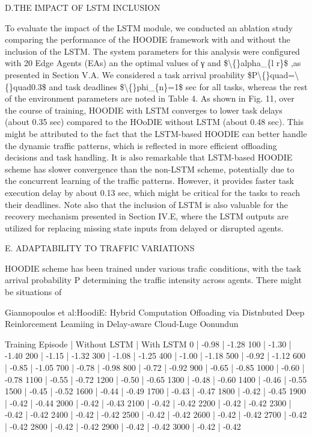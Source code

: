 \documentclass{article}
\begin{document}
D.THE IMPACT OF LSTM INCLUSION

To evaluate the impact of the LSTM module, we conducted an ablation study comparing the performance of the HOODIE framework with and without the inclusion of the LSTM. The system parameters for this analysis were configured with 20 Edge Agents (EAs) an the optimal values of γ and \$\textbackslash\{\}alpha\_\{l r\}\$ ,as presented in Section V.A. We considered a task arrival proability \$P\textbackslash\{\}quad=\textbackslash\{\}quad0.3\$ and task deadlines \$\textbackslash\{\}phi\_\{n\}=1\$ sec for all tasks, whereas the rest of the environment parameters are noted in Table 4. As shown in Fig. 11, over the course of training, HOODIE with LSTM converges to lower task delays (about 0.35 sec) compared to the HOoDIE without LSTM (about 0.48 sec). This might be attributed to the fact that the LSTM-based HOODIE can better handle the dynamic traffic patterns, which is reflected in more efficient offloading decisions and task handling. It is also remarkable that LSTM-based HOODIE scheme has slower convergence than the non-LSTM scheme, potentially due to the concurrent learning of the traffic patterns. However, it provides faster task execution delay by about 0.13 sec, which might be critical for the tasks to reach their deadlines. Note also that the inclusion of LSTM is also valuable for the recovery mechanism presented in Section IV.E, where the LSTM outputs are utilized for replacing missing state inputs from delayed or disrupted agents.

E. ADAPTABILITY TO TRAFFIC VARIATIONS

HOODIE scheme has been trained under various trafic conditions, with the task arrival probability P determining the traffic intensity across agents. There might be situations of

Giannopoulos et al:HoodiE: Hybrid Computation Offoading via Distnbuted Deep Reinlorcement Leamiing in Delay-aware Cloud-Luge Oonundun

Training Episode | Without LSTM | With LSTM
0 | -0.98 | -1.28
100 | -1.30 | -1.40
200 | -1.15 | -1.32
300 | -1.08 | -1.25
400 | -1.00 | -1.18
500 | -0.92 | -1.12
600 | -0.85 | -1.05
700 | -0.78 | -0.98
800 | -0.72 | -0.92
900 | -0.65 | -0.85
1000 | -0.60 | -0.78
1100 | -0.55 | -0.72
1200 | -0.50 | -0.65
1300 | -0.48 | -0.60
1400 | -0.46 | -0.55
1500 | -0.45 | -0.52
1600 | -0.44 | -0.49
1700 | -0.43 | -0.47
1800 | -0.42 | -0.45
1900 | -0.42 | -0.44
2000 | -0.42 | -0.43
2100 | -0.42 | -0.42
2200 | -0.42 | -0.42
2300 | -0.42 | -0.42
2400 | -0.42 | -0.42
2500 | -0.42 | -0.42
2600 | -0.42 | -0.42
2700 | -0.42 | -0.42
2800 | -0.42 | -0.42
2900 | -0.42 | -0.42
3000 | -0.42 | -0.42
\end{document}
